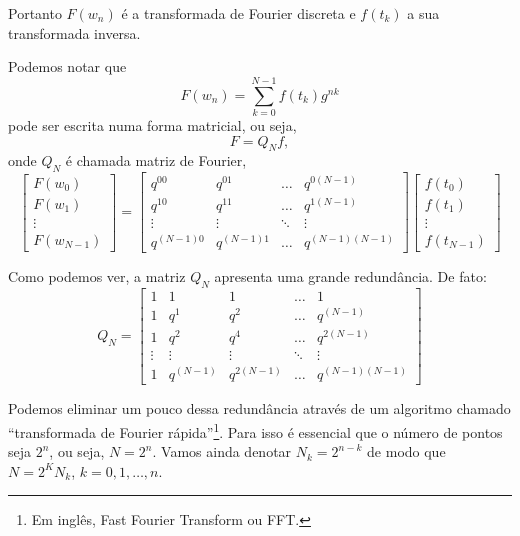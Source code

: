 Portanto $F(w_n)$ é a transformada de Fourier discreta e $f(t_k)$ a sua
transformada inversa.

Podemos notar que
\begin{dmath*}
  F(w_n) = \sum_{k = 0}^{N - 1} f(t_k) g^{n k}
\end{dmath*}
pode ser escrita numa forma matricial, ou seja,
\begin{dmath*}
  F = Q_N f,
\end{dmath*}
onde $Q_N$ é chamada matriz de Fourier,
\begin{dmath*}
  \begin{bmatrix}
    F(w_0) \\
    F(w_1) \\
    \vdots \\
    F(w_{N - 1})
    \end{bmatrix} = \begin{bmatrix}
    q^{00} & q^{01} & \ldots & q^{0(N - 1)} \\
    q^{10} & q^{11} & \ldots & q^{1(N - 1)} \\
    \vdots & \vdots & \ddots & \vdots \\
    q^{(N - 1)0} & q^{(N - 1)1} & \ldots & q^{(N - 1)(N - 1)}
  \end{bmatrix} \begin{bmatrix}
    f(t_0) \\
    f(t_1) \\
    \vdots \\
    f(t_{N - 1})
  \end{bmatrix}
\end{dmath*}

Como podemos ver, a matriz $Q_N$ apresenta uma grande redundância. De fato:
\begin{dmath*}
  Q_N =  \begin{bmatrix}
    1 & 1 & 1 & \ldots & 1 \\
    1 & q^{1} & q^{2} & \ldots & q^{(N - 1)} \\
    1 & q^{2} & q^{4} & \ldots & q^{2(N - 1)} \\
    \vdots & \vdots & \vdots & \ddots & \vdots \\
    1 & q^{(N - 1)} & q^{2 (N - 1)} & \ldots & q^{(N - 1)(N - 1)}
  \end{bmatrix}
\end{dmath*}

Podemos eliminar um pouco dessa redundância através de um algoritmo chamado
``transformada de Fourier rápida''\footnote{Em inglês, Fast Fourier Transform ou
FFT.}. Para isso é essencial que o número de pontos seja $2^n$, ou seja, $N =
2^n$. Vamos ainda denotar $N_k = 2^{n - k}$ de modo que $N = 2^K N_k$, $k = 0,
1, \ldots, n$.

